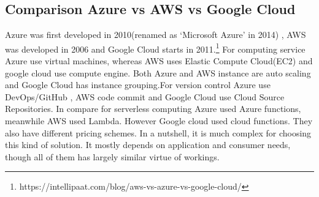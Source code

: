 %
\subsection{Comparison Azure vs AWS vs Google Cloud}
%

Azure was first developed in 2010(renamed as ‘Microsoft Azure’ in 2014) , AWS was developed in 2006 and Google Cloud starts in 2011.\footnote{https://intellipaat.com/blog/aws-vs-azure-vs-google-cloud/} For computing service Azure use virtual machines, whereas AWS uses Elastic Compute Cloud(EC2) and google cloud use compute engine. Both Azure and AWS instance are auto scaling and Google Cloud has instance grouping\cite{articleComparison}.For version control Azure use DevOps/GitHub , AWS code commit and Google Cloud use Cloud Source Repositories. In compare for serverless computing Azure used Azure functions, meanwhile AWS used Lambda. However Google cloud used cloud functions. They also have different pricing schemes. In a nutshell, it is much complex for choosing this kind of solution. It mostly depends on application and consumer needs, though all of them has largely similar virtue of workings.  
